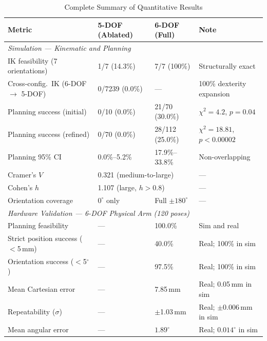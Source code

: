 \documentclass[conference]{IEEEtran}
\begin{document}
	\begin{table}[t]
		\centering
		\caption{Complete Summary of Quantitative Results}
		\label{tab:summary}
		\renewcommand{\arraystretch}{1.3}
		\small
		\begin{tabular}{llll}
			\toprule
			\textbf{Metric} & \textbf{5-DOF (Ablated)} & \textbf{6-DOF (Full)} & \textbf{Note} \\
			\midrule
			\multicolumn{4}{l}{\textit{Simulation --- Kinematic and Planning}} \\
			IK feasibility (7 orientations)              & 1/7 (14.3\%)    & 7/7 (100\%)          & Structurally exact \\
			Cross-config.\ IK (6-DOF $\to$ 5-DOF)       & 0/7239 (0.0\%)  & ---                  & 100\% dexterity expansion \\
			Planning success (initial)                   & 0/10 (0.0\%)    & 21/70 (30.0\%)       & $\chi^2=4.2$, $p=0.04$ \\
			Planning success (refined)                   & 0/70 (0.0\%)    & 28/112 (25.0\%)      & $\chi^2=18.81$, $p<0.00002$ \\
			Planning 95\% CI                             & 0.0\%--5.2\%    & 17.9\%--33.8\%       & Non-overlapping \\
			Cramer's $V$                                 & \multicolumn{2}{l}{0.321 (medium-to-large)} & --- \\
			Cohen's $h$                                  & \multicolumn{2}{l}{1.107 (large, $h>0.8$)}  & --- \\
			Orientation coverage                         & $0^\circ$ only  & Full $\pm180^\circ$  & --- \\
			\midrule
			\multicolumn{4}{l}{\textit{Hardware Validation --- 6-DOF Physical Arm (120 poses)}} \\
			Planning feasibility                         & ---  & 100.0\%        & Sim and real \\
			Strict position success ($<$5\,mm)           & ---  & 40.0\%         & Real; 100\% in sim \\
			Orientation success ($<$5$^\circ$)           & ---  & 97.5\%         & Real; 100\% in sim \\
			Mean Cartesian error                         & ---  & 7.85\,mm       & Real; 0.05\,mm in sim \\
			Repeatability ($\sigma$)                     & ---  & $\pm$1.03\,mm  & Real; $\pm$0.006\,mm in sim \\
			Mean angular error                           & ---  & $1.89^\circ$   & Real; $0.014^\circ$ in sim \\
			\bottomrule
		\end{tabular}
	\end{table}
	
\end{document}
